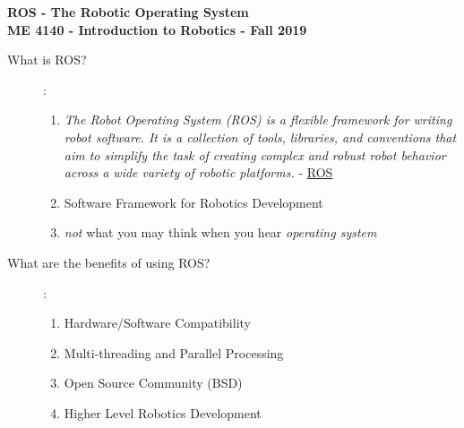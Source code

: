 \documentclass[12pt]{article}
\begin{document}
\thispagestyle{plain}

\begin{center}
    {\bf \Large ROS - The Robotic Operating System} \vspace{3mm} \\
   {\bf \large ME 4140 - Introduction to Robotics - Fall 2019} \\
\end{center}

\Large
\begin{description}

    	\item[What is ROS?]: 
            \begin{enumerate}
		\item {\it The Robot Operating System (ROS) is a flexible framework for writing robot software. It is a collection of tools, libraries, and conventions that aim to simplify the task of creating complex and robust robot behavior across a wide variety of robotic platforms.} - \href{http://www.ros.org/about-ros/}{ROS}       
                 \item Software Framework for Robotics Development
                \item {\it not} what you may think when you hear {\it operating system}                    
            \end{enumerate}
      
        \item[What are the benefits of using ROS?]: 
            \begin{enumerate}
                \item Hardware/Software Compatibility   
                \item Multi-threading and Parallel Processing   
                \item Open Source Community (BSD)    
                \item Higher Level Robotics Development                   
            \end{enumerate}    
            


\end{description}
\end{document}
